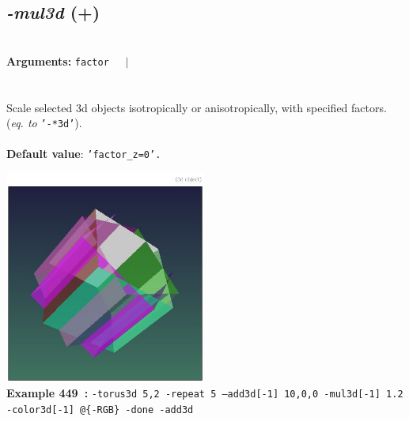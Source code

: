 \documentclass[a4paper,11pt,twoside]{book}
\begin{document}
\subsection{\emph{-mul3d} (+)}\vspace*{-0.5em}
~\\\textbf{Arguments: } 
{\small \texttt{factor}}~~~$|$\\
\\~\\
Scale selected 3d objects isotropically or anisotropically, with specified factors.
~\\(\emph{eq. to} {\small \texttt{'-*3d'}}).
~\\~\\\textbf{Default value}: {\small \texttt{'factor\_z=0'.}}
\begin{center}\includegraphics[keepaspectratio=true,height=7cm,width=\textwidth]{img/gmic_def449.jpg}\\
{\footnotesize \textbf{Example 449~:} \texttt{-torus3d 5,2 -repeat 5 --add3d[-1] 10,0,0 -mul3d[-1] 1.2 -color3d[-1] @\{-RGB\} -done -add3d}}
\end{center}
\end{document}
